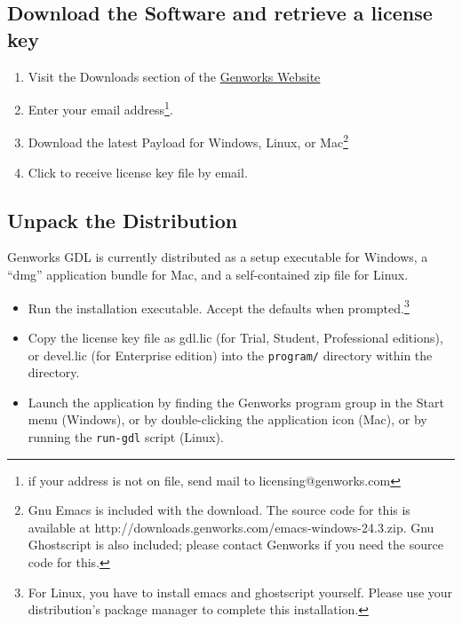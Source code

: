 \documentclass [11pt]{book}
\begin{document}
\subsection{Download the Software and retrieve a license key}

\label{subsec:downloadthesoftwareandretrievealicensekey}



\begin{enumerate}

\item Visit the Downloads section of the \href{http://genworks.com}{Genworks Website}

\item Enter your email address\footnote{if your address is not on file, send mail to licensing@genworks.com}.

\item Download the latest Payload for Windows, Linux, or Mac\footnote{Gnu Emacs is included with the download. The source code for this 
is available at http://downloads.genworks.com/emacs-windows-24.3.zip. Gnu Ghostscript
is also included; please contact Genworks if you need the source code for this.}

\item Click to receive license key file by email.

\end{enumerate}



\subsection{Unpack the Distribution}

\label{subsec:unpackthedistribution}

Genworks GDL is currently distributed as a setup executable for Windows,
a ``dmg'' application bundle for Mac, and a self-contained zip file for Linux.

\begin{itemize}

\item Run the installation executable. Accept the defaults when prompted.\footnote{For Linux, you have to install emacs and ghostscript yourself. Please use your distribution's package manager to complete this installation.}

\item Copy the license key file as gdl.lic (for Trial,
	 Student, Professional editions), or devel.lic (for Enterprise edition) into the \texttt{program/} directory within the 
 directory.

\item Launch the application by finding the Genworks program group in the Start menu (Windows), or by double-clicking the application icon (Mac), or by running the \texttt{run-gdl} script (Linux).

\end{itemize}
\end{document}
